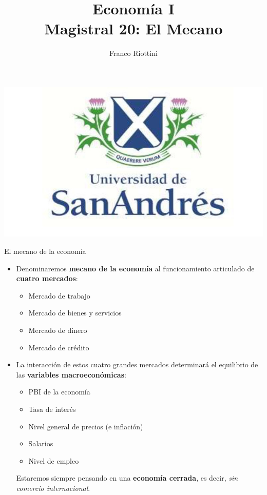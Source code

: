\documentclass{beamer}
\title[Economía I]{Economía I \vspace{4mm}
\\ Magistral 20: El Mecano}
\date{}
\author[Franco Riottini]{Franco Riottini}
\institute[]{Universidad de San Andrés}
\begin{document}
\begin{frame}
\titlepage
\centering

\includegraphics[scale=0.2]{../Figures/logoUDESA.jpg} 
\end{frame}

\begin{frame}{El mecano de la economía}
    \begin{itemize}
        \item Denominaremos \textbf{mecano de la economía} al funcionamiento articulado de \textbf{cuatro mercados}:
        \begin{itemize}
            \item Mercado de trabajo
            \item Mercado de bienes y servicios
            \item Mercado de dinero 
            \item Mercado de crédito    
        \end{itemize}
        \vspace{2mm}
        \item La interacción de estos cuatro grandes mercados determinará el equilibrio de las \textbf{variables macroeconómicas}:
        \begin{itemize}
            \item PBI de la economía
            \item Tasa de interés
            \item Nivel general de precios (e inflación)
            \item Salarios  
            \item Nivel de empleo
        \end{itemize}
        \begin{boxB}
            \centering
            Estaremos siempre pensando en una \textbf{economía cerrada}, es decir, \textit{sin comercio internacional}. 
        \end{boxB} 
    \end{itemize}
\end{frame}
\end{document}
